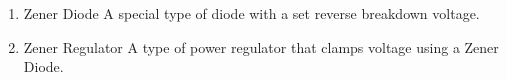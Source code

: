 \documentclass{IEEEtran}
\begin{document}
\begin{enumerate}
\\
\\

\\
\\

\\
\item Zener Diode
  \subitem A special type of diode with a set reverse breakdown voltage.\\
\item Zener Regulator
  \subitem A type of power regulator that clamps voltage using a Zener Diode.\\
\end{enumerate}
\end{document}
